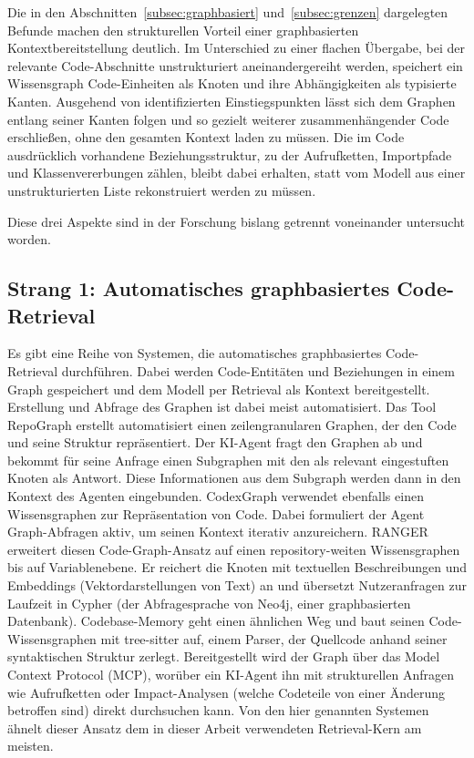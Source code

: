 Die in den Abschnitten~\ref{subsec:graphbasiert} und~\ref{subsec:grenzen} dargelegten Befunde machen den strukturellen Vorteil einer graphbasierten Kontextbereitstellung deutlich. Im Unterschied zu einer flachen Übergabe, bei der relevante Code-Abschnitte unstrukturiert aneinandergereiht werden, speichert ein Wissensgraph Code-Einheiten als Knoten und ihre Abhängigkeiten als typisierte Kanten. Ausgehend von identifizierten Einstiegspunkten lässt sich dem Graphen entlang seiner Kanten folgen und so gezielt weiterer zusammenhängender Code erschließen, ohne den gesamten Kontext laden zu müssen. Die im Code ausdrücklich vorhandene Beziehungsstruktur, zu der Aufrufketten, Importpfade und Klassenvererbungen zählen, bleibt dabei erhalten, statt vom Modell aus einer unstrukturierten Liste rekonstruiert werden zu müssen.

Diese drei Aspekte sind in der Forschung bislang getrennt voneinander untersucht worden.

\subsection{Strang 1: Automatisches graphbasiertes Code-Retrieval}

Es gibt eine Reihe von Systemen, die automatisches graphbasiertes Code-Retrieval durchführen. Dabei werden Code-Entitäten und Beziehungen in einem Graph gespeichert und dem Modell per Retrieval als Kontext bereitgestellt. Erstellung und Abfrage des Graphen ist dabei meist automatisiert. Das Tool RepoGraph \parencite{ouyang2024repograph} erstellt automatisiert einen zeilengranularen Graphen, der den Code und seine Struktur repräsentiert. Der KI-Agent fragt den Graphen ab und bekommt für seine Anfrage einen Subgraphen mit den als relevant eingestuften Knoten als Antwort. Diese Informationen aus dem Subgraph werden dann in den Kontext des Agenten eingebunden.
CodexGraph \parencite{liu2025codexgraph} verwendet ebenfalls einen Wissensgraphen zur Repräsentation von Code. Dabei formuliert der Agent Graph-Abfragen aktiv, um seinen Kontext iterativ anzureichern.
RANGER \parencite{shah2025ranger} erweitert diesen Code-Graph-Ansatz auf einen repository-weiten Wissensgraphen bis auf Variablenebene. Er reichert die Knoten mit textuellen Beschreibungen und Embeddings (Vektordarstellungen von Text) an und übersetzt Nutzeranfragen zur Laufzeit in Cypher (der Abfragesprache von Neo4j, einer graphbasierten Datenbank).
Codebase-Memory \parencite{vogel2026codebasememory} geht einen ähnlichen Weg und baut seinen Code-Wissensgraphen mit tree-sitter auf, einem Parser, der Quellcode anhand seiner syntaktischen Struktur zerlegt. Bereitgestellt wird der Graph über das Model Context Protocol (MCP), worüber ein KI-Agent ihn mit strukturellen Anfragen wie Aufrufketten oder Impact-Analysen (welche Codeteile von einer Änderung betroffen sind) direkt durchsuchen kann. Von den hier genannten Systemen ähnelt dieser Ansatz dem in dieser Arbeit verwendeten Retrieval-Kern am meisten.

